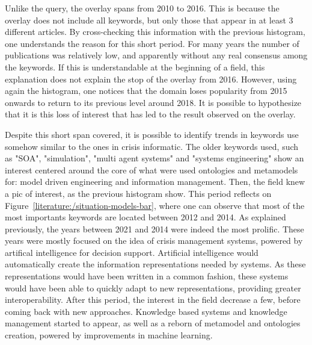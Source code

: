 Unlike the query, the overlay spans from 2010 to 2016. This is because the overlay does not include all keywords, but only those that appear in at least 3 different articles.
By cross-checking this information with the previous histogram, one understands the reason for this short period.
For many years the number of publications was relatively low, and apparently without any real consensus among the keywords.
If this is understandable at the beginning of a field, this explanation does not explain the stop of the overlay from 2016.
However, using again the histogram, one notices that the domain loses popularity from 2015 onwards to return to its previous level around 2018.
It is possible to hypothesize that it is this loss of interest that has led to the result observed on the overlay.

Despite this short span covered, it is possible to identify trends in keywords use somehow similar to the ones in crisis informatic.
The older keywords used, such as "SOA", "simulation", "multi agent systems" and "systems engineering" show an interest centered around the core of what were used ontologies and metamodels for: model driven engineering and information management.
Then, the field knew a pic of interest, as the previous histogram show.
This period reflects on Figure~\ref{literature:/situation-models-bar}, where one can observe that most of the most importants keywords are located between 2012 and 2014.
As explained previously, the years between 2021 and 2014 were indeed the most prolific.
These years were mostly focused on the idea of crisis management systems, powered by artifical intelligence for decision support.
Artificial intelligence would automatically create the information representations needed by systems.
As these representations would have been written in a common fashion, these systems would have been able to quickly adapt to new representations, providing greater interoperability.
After this period, the interest in the field decrease a few, before coming back with new approaches.
Knowledge based systems and knowledge management started to appear, as well as a reborn of metamodel and ontologies creation, powered by improvements in machine learning.

